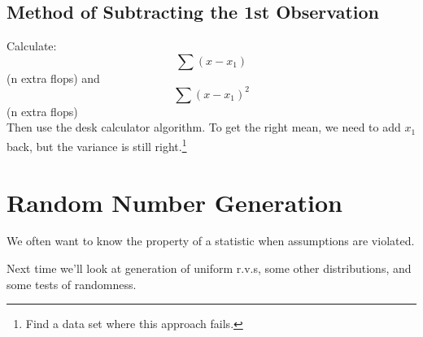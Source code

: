 \documentclass{article}
\begin{document}
\subsection{Method of Subtracting the 1st Observation}
Calculate:
\[\sum(x-x_1)\]
(n extra flops) and 
\[\sum(x-x_1)^2 \]
(n extra flops)\\
Then use the desk calculator algorithm.  To get the right mean, we need to
add $x_1$ back, but the variance is still right.\footnote{Find a data set 
where this approach fails.}

\section{Random Number Generation}
We often want to know the property of a statistic when assumptions are 
violated.

Next time we'll look at generation of uniform r.v.s, some other distributions,
and some tests of randomness.
\end{document}
